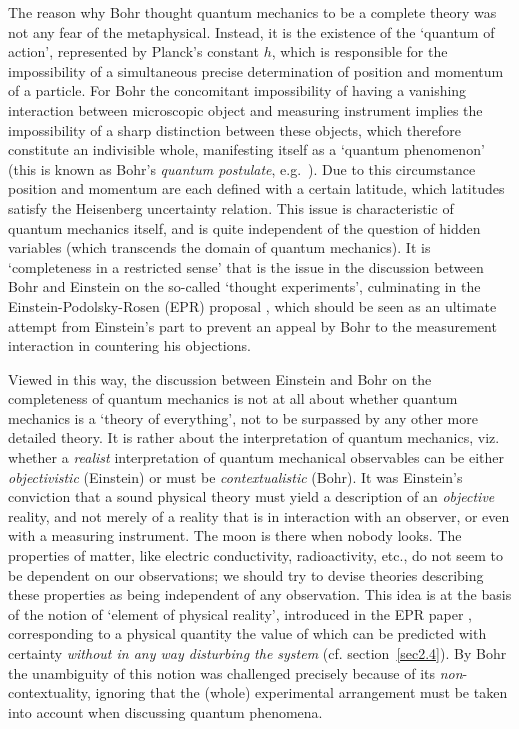 \documentclass[12pt]{article}
\begin{document}
The reason why Bohr thought quantum mechanics to be a complete
theory was not any fear of the metaphysical. Instead, it is the
existence of the `quantum of action', represented by Planck's
constant $h$, which is responsible for the impossibility of a
simultaneous precise determination of position and momentum of a
particle. For Bohr the concomitant impossibility of having a
vanishing interaction between microscopic object and measuring
instrument implies the impossibility of a sharp distinction
between these objects, which therefore constitute an indivisible
whole, manifesting itself as a `quantum phenomenon' (this is known
as Bohr's {\em quantum postulate}, e.g.~\cite{Bohr49}). Due to
this circumstance position and momentum are each defined with a
certain latitude, which latitudes satisfy the Heisenberg
uncertainty relation. This issue is characteristic of quantum
mechanics itself, and is quite independent of the question of
hidden variables (which transcends the domain of quantum
mechanics). It is `completeness in a restricted sense' that is the
issue in the discussion between Bohr and Einstein on the so-called
`thought experiments', culminating in the Einstein-Podolsky-Rosen
(EPR) proposal \cite{EPR}, which should be seen as an ultimate
attempt from Einstein's part to prevent an appeal by Bohr to the
measurement interaction in countering his objections.

Viewed in this way, the discussion between Einstein and Bohr on
the completeness of quantum mechanics is not at all about whether
quantum mechanics is a `theory of everything', not to be surpassed
by any other more detailed theory. It is rather about the
interpretation of quantum mechanics, viz. whether a {\em realist}
interpretation of quantum mechanical observables can be either
{\em objectivistic} (Einstein) or must be {\em contextualistic}
(Bohr). It was Einstein's conviction that a sound physical theory
must yield a description of an {\em objective} reality, and not
merely of a reality that is in interaction with an observer, or
even with a measuring instrument. The moon is there when nobody
looks. The properties of matter, like electric conductivity,
radioactivity, etc., do not seem to be dependent on our
observations; we should try to devise theories describing these
properties as being independent of any observation. This idea is
at the basis of the notion of `element of physical reality',
introduced in the EPR paper \cite{EPR}, corresponding to a
physical quantity the value of which can be predicted with
certainty {\em without in any way disturbing the system} (cf.
section~\ref{sec2.4}). By Bohr \cite{Bohr35} the unambiguity of
this notion was challenged precisely because of its {\em
non}-contextuality, ignoring that the (whole) experimental arrangement
must be taken into account when discussing quantum phenomena.
\end{document}
